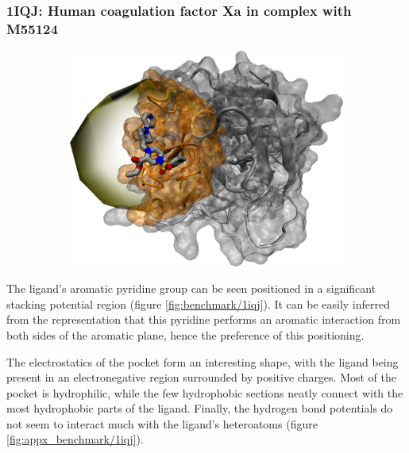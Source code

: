     \subsubsection{1IQJ: Human coagulation factor Xa in complex with M55124}
      \begin{figure}[H] \centering
        \begin{subfigure}[c]{0.3\textwidth} \centering
          \includegraphics[width=1\textwidth]{figures/results/ps_prot/1iqj.png}
        \end{subfigure}
        \begin{subfigure}[c]{0.3\textwidth} \centering
        \end{subfigure}
      \end{figure}

      The ligand's aromatic pyridine group can be seen positioned in a significant stacking potential region (figure \ref{fig:benchmark/1iqj}). It can be easily inferred from the representation that this pyridine performs an aromatic interaction from both sides of the aromatic plane, hence the preference of this positioning.

      The electrostatics of the pocket form an interesting shape, with the ligand being present in an electronegative region surrounded by positive charges. Most of the pocket is hydrophilic, while the few hydrophobic sections neatly connect with the most hydrophobic parts of the ligand. Finally, the hydrogen bond potentials do not seem to interact much with the ligand's heteroatoms (figure \ref{fig:appx_benchmark/1iqj}).

